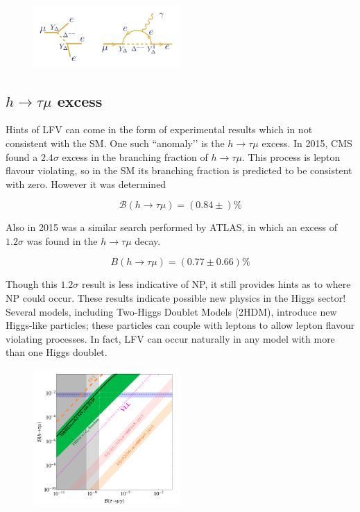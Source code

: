 \documentclass[12pt,a4paper]{article} %
\newcommand{\br}{\mathcal{B}}
\newcommand{\htm}{h\to \tau \mu}
\begin{document}
\begin{figure}[h]
\centering
\includegraphics[width=0.5\textwidth]{images/seesaw-lfv-modes.png}
\caption{}
\label{}
\end{figure}




\subsection{$\htm$ excess}

Hints of LFV can come in the form of experimental results which in not consistent with the SM. One such ``anomaly’’ is the $\htm$ excess. In 2015, CMS found a $2.4\sigma$ excess in the branching fraction of $\htm$. This process is lepton flavour violating, so in the SM its branching fraction is predicted to be consistent with zero. However it was determined

\begin{equation}
\br(h\to \tau \mu) = (0.84\pm)\%
\end{equation}


Also in 2015 was a similar search performed by ATLAS, in which an excess of $1.2\sigma$ was found in the $\htm$ decay. 

\begin{equation}
B(\htm) = (0.77 \pm 0.66)\%
\end{equation}

Though this $1.2\sigma$ result is less indicative of NP, it still provides hints as to where NP could occur. These results indicate possible new physics in the Higgs sector! Several models, including Two-Higgs Doublet Models (2HDM), introduce new Higgs-like particles; these particles can couple with leptons to allow lepton flavour violating processes. In fact, LFV can occur naturally in any model with more than one Higgs doublet.


\begin{figure}[h]
\centering
\includegraphics[width=0.5\textwidth]{images/h-vs-tau.png}
\caption{}
\label{}
\end{figure}
\end{document}
